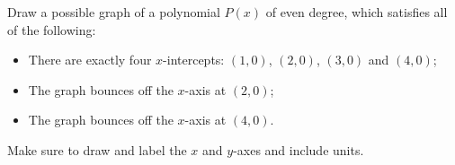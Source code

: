 \documentclass[11pt,answers]{exam}
\begin{document}
\begin{questions}
\begin{parts}
\fillwithdottedlines{3cm}

\end{parts}

\bonusquestion[2]  Draw a possible graph of a polynomial $P(x)$ of even degree, which satisfies all of the following:
\begin{itemize}
	\item There are exactly four $x$-intercepts:  $(1,0)$, $(2,0)$, $(3,0)$ and $(4,0)$;
	\item The graph bounces off the $x$-axis at $(2,0)$;
	\item The graph bounces off the $x$-axis at $(4,0)$.
	
\end{itemize}   

Make sure to draw and label the $x$ and $y$-axes and include units.


\end{questions}
\end{document}
